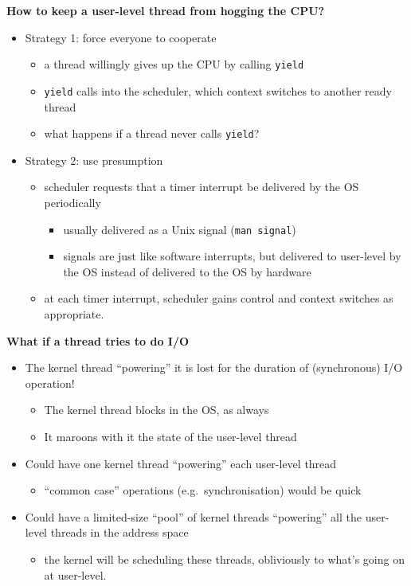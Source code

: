\documentclass[11pt,a4paper]{article}
\begin{document}
\textbf{How to keep a user-level thread from hogging the CPU?}
\begin{itemize}
    \item Strategy 1: force everyone to cooperate
        \begin{itemize}
            \item a thread willingly gives up the CPU by calling \texttt{yield}
            \item \texttt{yield} calls into the scheduler, which context switches to
                another ready thread
            \item what happens if a thread never calls \texttt{yield}?
        \end{itemize}
    \item Strategy 2: use presumption
        \begin{itemize}
            \item scheduler requests that a timer interrupt be delivered by the OS
                periodically
                \begin{itemize}
                    \item usually delivered as a Unix signal (\texttt{man signal})
                    \item signals are just like software interrupts, but delivered to
                        user-level by the OS instead of delivered to the OS by hardware
                \end{itemize}
            \item at each timer interrupt, scheduler gains control and context switches
                as appropriate.
        \end{itemize}
\end{itemize}

\textbf{What if a thread tries to do I/O}
\begin{itemize}
    \item The kernel thread ``powering'' it is lost for the duration of (synchronous)
        I/O operation!
        \begin{itemize}
            \item The kernel thread blocks in the OS, as always
            \item It maroons with it the state of the user-level thread
        \end{itemize}
    \item Could have one kernel thread ``powering'' each user-level thread
        \begin{itemize}
            \item ``common case'' operations (e.g.\ synchronisation) would be quick
        \end{itemize}
    \item Could have a limited-size ``pool'' of kernel threads ``powering'' all the
        user-level threads in the address space
        \begin{itemize}
            \item the kernel will be scheduling these threads, obliviously to what's going
                on at user-level.
        \end{itemize}
\end{itemize}
\end{document}
